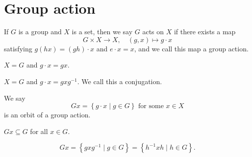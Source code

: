 \section{Group action}
\begin{definition}
    If \(G\) is a group and \(X\) is a set, then we say \(G\) acts on \(X\) if there exists a map 
    \[
        G \times X \to X, \quad (g, x) \mapsto g \cdot x
    \] satisfying \(g \left( hx \right) = (gh) \cdot x \) and \(e \cdot x = x\), and we call this map a group action. 
\end{definition}

\begin{eg}
    \(X = G\) and \(g \cdot x = gx\).  
\end{eg}

\begin{eg}
    \(X=G\) and \(g \cdot x = gxg^{-1}\). We call this a conjugation.  
\end{eg}

\begin{definition}
    We say
    \[
        Gx = \left\{ g \cdot x \mid g \in G \right\} \text{ for some } x \in X
    \] is an orbit of a group action.
\end{definition}

\begin{eg}
    \(Gx \subseteq G\) for all \(x \in G\).  
\end{eg}

\begin{eg}
    \[
        Gx = \left\{ gxg^{-1} \mid g \in G \right\} = \left\{ h^{-1} x h \mid h \in G \right\}.  
    \]
\end{eg}


